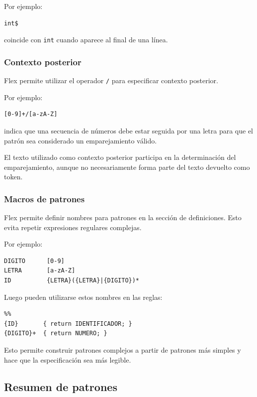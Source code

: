 \documentclass{article}
\begin{document}
Por ejemplo:

\begin{verbatim}
int$
\end{verbatim}

coincide con \texttt{int} cuando aparece al final de una línea.

\subsubsection{Contexto posterior}

Flex permite utilizar el operador \texttt{/} para especificar contexto
posterior.

Por ejemplo:

\begin{verbatim}
[0-9]+/[a-zA-Z]
\end{verbatim}

indica que una secuencia de números debe estar seguida por una letra para
que el patrón sea considerado un emparejamiento válido.

El texto utilizado como contexto posterior participa en la determinación
del emparejamiento, aunque no necesariamente forma parte del texto
devuelto como token.

\subsubsection{Macros de patrones}

Flex permite definir nombres para patrones en la sección de
definiciones. Esto evita repetir expresiones regulares complejas.

Por ejemplo:

\begin{verbatim}
DIGITO      [0-9]
LETRA       [a-zA-Z]
ID          {LETRA}({LETRA}|{DIGITO})*
\end{verbatim}

Luego pueden utilizarse estos nombres en las reglas:

\begin{verbatim}
%%
{ID}       { return IDENTIFICADOR; }
{DIGITO}+  { return NUMERO; }
\end{verbatim}

Esto permite construir patrones complejos a partir de patrones más
simples y hace que la especificación sea más legible.

\subsection{Resumen de patrones}
\end{document}
